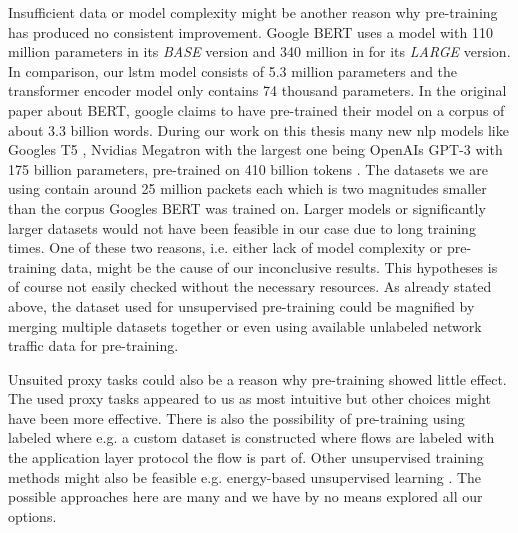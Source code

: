 Insufficient data or model complexity might be another reason why pre-training has produced no consistent improvement. Google BERT \cite{bert} uses a model with 110 million parameters in its \textit{BASE} version and 340 million in for its \textit{LARGE} version. In comparison, our \gls{lstm} model consists of 5.3 million parameters and the transformer encoder model only contains 74 thousand parameters. In the original paper about BERT, google claims to have pre-trained their model on a corpus of about 3.3 billion words. During our work on this thesis many new \gls{nlp} models like Googles T5 \cite{google_t5}, Nvidias Megatron \cite{megatron} with the largest one being OpenAIs GPT-3 with 175 billion parameters, pre-trained on 410 billion tokens \cite{gpt3}. The datasets we are using contain around 25 million packets each which is two magnitudes smaller than the corpus Googles BERT was trained on. Larger models or significantly larger datasets would not have been feasible in our case due to long training times. One of these two reasons, i.e. either lack of model complexity or pre-training data, might be the cause of our inconclusive results. This hypotheses is of course not easily checked without the necessary resources. As already stated above, the dataset used for unsupervised pre-training could be magnified by merging multiple datasets together or even using available unlabeled network traffic data for pre-training. \par

Unsuited proxy tasks could also be a reason why pre-training showed little effect. The used proxy tasks appeared to us as most intuitive but other choices might have been more effective. There is also the possibility of pre-training using labeled where e.g. a custom dataset is constructed where flows are labeled with the application layer protocol the flow is part of. Other unsupervised training methods might also be feasible e.g. energy-based unsupervised learning \cite{energy_based_training}. The possible approaches here are many and we have by no means explored all our options. \par

